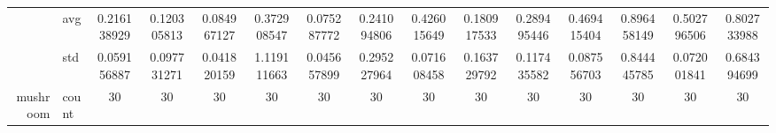 \begin{table}[H]
{\begin{tabular}{rlccc|c|c|c|c|c|ccccc}
			                                                                               & avg                & \cellcolor[rgb]{ .788,  .859,  .502}0.216138929                                & \cellcolor[rgb]{ .514,  .78,  .486}0.120305813                                 & \cellcolor[rgb]{ .416,  .753,  .482}0.084967127                                & \cellcolor[rgb]{ 1,  .855,  .506}0.372908547    & \cellcolor[rgb]{ .388,  .745,  .482}\textcolor[rgb]{ 0,  .38,  0}{0.075287772} & \cellcolor[rgb]{ .859,  .878,  .506}0.241094806 & \cellcolor[rgb]{ .996,  .808,  .498}0.426015649                                & \cellcolor[rgb]{ .686,  .831,  .498}0.180917533 & \cellcolor[rgb]{ 1,  .922,  .518}0.289495446    & \cellcolor[rgb]{ .992,  .773,  .49}0.469415404  & \cellcolor[rgb]{ .973,  .412,  .42}0.896458149  & \cellcolor[rgb]{ .992,  .745,  .486}0.502796506 & \cellcolor[rgb]{ .98,  .494,  .435}0.802733988  \\
			                                                                               & std                & 0.059156887                                                                    & 0.097731271                                                                    & 0.041820159                                                                    & 1.119111663                                     & 0.045657899                                                                    & 0.295227964                                     & 0.071608458                                                                    & 0.163729792                                     & 0.117435582                                     & 0.087556703                                     & 0.844445785                                     & 0.072001841                                     & 0.684394699                                     \\
			mushroom                                                                       & count              & 30                                                                             & 30                                                                             & 30                                                                             & 30                                              & 30                                                                             & 30                                              & 30                                                                             & 30                                              & 30                                              & 30                                              & 30                                              & 30                                              & 30                                              \\

\end{tabular}}
\end{table}
